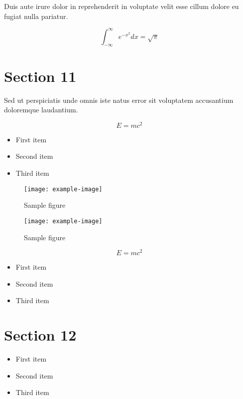 \documentclass{article}
\begin{document}
Duis aute irure dolor in reprehenderit in voluptate velit esse cillum dolore eu fugiat nulla pariatur.

\begin{equation}
    \int_{-\infty}^{\infty} e^{-x^2} dx = \sqrt{\pi}
\end{equation}


\section{Section 11}

Sed ut perspiciatis unde omnis iste natus error sit voluptatem accusantium doloremque laudantium.

\begin{equation}
    E = mc^2
\end{equation}


\begin{itemize}
\item First item
\item Second item
\item Third item
\end{itemize}

\begin{figure}[h]
    \centering
    \texttt{[image: example-image]}
    \caption{Sample figure}
    \label{fig:sample}
\end{figure}

\begin{figure}[h]
    \centering
    \texttt{[image: example-image]}
    \caption{Sample figure}
    \label{fig:sample}
\end{figure}

\begin{equation}
    E = mc^2
\end{equation}


\begin{itemize}
\item First item
\item Second item
\item Third item
\end{itemize}

\section{Section 12}

\begin{itemize}
\item First item
\item Second item
\item Third item
\end{itemize}
\end{document}
